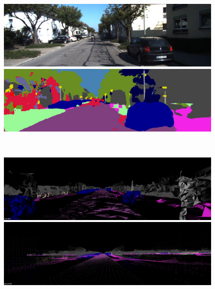 \begin{figure}[htbp]
 \begin{minipage}[b]{0.50\hsize}
 \begin{center}
  \includegraphics[keepaspectratio, scale=0.18]{./picture/bgrimage/bgrimage0.jpg}
  \end{center}
 \end{minipage}
 \begin{minipage}[b]{0.5\hsize}
 \begin{center}
  \includegraphics[keepaspectratio, scale=0.18]{./picture/segimage/image0.jpg}
  \end{center}
 \end{minipage} \\
 \begin{minipage}[b]{0.50\hsize}
 \begin{center}
  \includegraphics[keepaspectratio, scale=0.18]{./picture/mesh_map_image/image0.jpg}
  \end{center}
 \end{minipage}
 \begin{minipage}[b]{0.50\hsize}
 \begin{center}
  \includegraphics[keepaspectratio, scale=0.18]{./picture/point_map_image/image0.jpg}

\end{center}
\end{minipage}
\end{figure}
